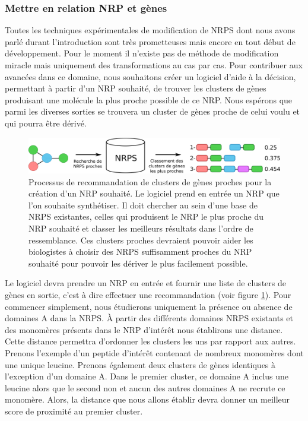 \subsubsection{Mettre en relation NRP et gènes}

Toutes les techniques expérimentales de modification de NRPS dont nous avons parlé durant l'introduction sont très prometteuses mais encore en tout début de développement.
Pour le moment il n'existe pas de méthode de modification miracle mais uniquement des transformations au cas par cas.
Pour contribuer aux avancées dans ce domaine, nous souhaitons créer un logiciel d'aide à la décision, permettant à partir d'un NRP souhaité, de trouver les clusters de gènes produisant une molécule la plus proche possible de ce NRP.
Nous espérons que parmi les diverses sorties se trouvera un cluster de gènes proche de celui voulu et qui pourra être dérivé.

\begin{figure}[h!]
  \begin{center}
    \includegraphics[width=450px]{Figures/synthese/recommandation.png}
    \caption{\label{reco}Processus de recommandation de clusters de gènes proches pour la création d'un NRP souhaité.
    Le logiciel prend en entrée un NRP que l'on souhaite synthétiser.
    Il doit chercher au sein d'une base de NRPS existantes, celles qui produisent le NRP le plus proche du NRP souhaité et classer les meilleurs résultats dans l'ordre de ressemblance.
    Ces clusters proches devraient pouvoir aider les biologistes à choisir des NRPS suffisamment proches du NRP souhaité pour pouvoir les dériver le plus facilement possible.}
  \end{center}
\end{figure}

Le logiciel devra prendre un NRP en entrée et fournir une liste de clusters de gènes en sortie, c'est à dire effectuer une recommandation (voir figure \ref{reco}).
Pour commencer simplement, nous étudierons uniquement la présence ou absence de domaines A dans la NRPS.
À partir des différents domaines NRPS existants et des monomères présents dans le NRP d'intérêt nous établirons une distance.
Cette distance permettra d'ordonner les clusters les uns par rapport aux autres.
Prenons l'exemple d'un peptide d'intérêt contenant de nombreux monomères dont une unique leucine.
Prenons également deux clusters de gènes identiques à l'exception d'un domaine A.
Dans le premier cluster, ce domaine A inclus une leucine alors que le second non et aucun des autres domaines A ne recrute ce monomère.
Alors, la distance que nous allons établir devra donner un meilleur score de proximité au premier cluster.

